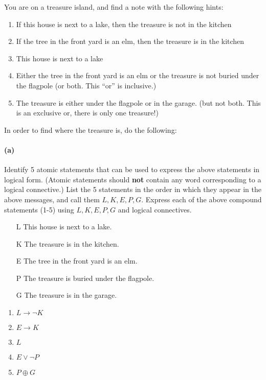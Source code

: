 \documentclass[english]{article}
\begin{document}
You are on a treasure island, and find a note with the following hints:
\begin{enumerate}
\item If this house is next to a lake, then the treasure is not in the kitchen
\item If the tree in the front yard is an elm, then the treasure is in the kitchen
\item This house is next to a lake
\item Either the tree in the front yard is an elm or the treasure is not buried under the flagpole
  (or both. This ``or'' is inclusive.)
\item The treasure is either under the flagpole or in the garage.
  (but not both. This is an exclusive or, there is only one treasure!)
\end{enumerate}

In order to find where the treasure is, do the following:

\paragraph{(a)}
Identify 5 atomic statements that can be used to express the above statements in logical form. (Atomic statements should \textbf{not} contain any
word corresponding to a logical connective.)
List the 5 statements in the order in which they 
appear in the above messages, and call them $L,K,E,P,G$. Express each of the above compound statements (1-5) using $L,K,E,P,G$ and 
logical connectives.

\begin{enumerate}
  \item [{{L}}] This house is next to a lake.
  \item [{{K}}] The treasure is in the kitchen.
  \item [{{E}}] The tree in the front yard is an elm.
  \item [{{P}}] The treasure is buried under the flagpole.
  \item [{{G}}] The treasure is in the garage.
\end{enumerate}

\begin{enumerate}
  \item $L \to \lnot K$
  \item $E \to K$
  \item $L$
  \item $E \lor \lnot P$
  \item $P \oplus G $
\end{enumerate}
\end{document}
